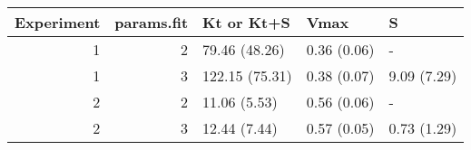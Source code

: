 \captionsetup[table]{labelformat=empty,skip=1pt}
\begin{longtable}{rrlll}
\toprule
Experiment & params.fit & Kt or Kt+S & Vmax & S \\ 
\midrule
1 & 2 & 79.46 (48.26) & 0.36 (0.06) & - \\ 
1 & 3 & 122.15 (75.31) & 0.38 (0.07) & 9.09 (7.29) \\ 
2 & 2 & 11.06 (5.53) & 0.56 (0.06) & - \\ 
2 & 3 & 12.44 (7.44) & 0.57 (0.05) & 0.73 (1.29) \\ 
\bottomrule
\end{longtable}

